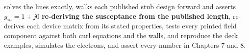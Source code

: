 \vspace{2pt}
{\footnotesize\color{sub} 
 solves the lines exactly,  walks each published stub design
forward and asserts $y_{in}=1+j0$ \textbf{re-deriving the susceptance from the published
length},  re-derives each device matrix from its stated properties,
 tests every printed field component against both curl equations and the walls,
 and  reproduce the deck examples,  simulates the
electrons,  and  assert every number in Chapters 7 and 8.}

\par{}\vspace{4pt}


